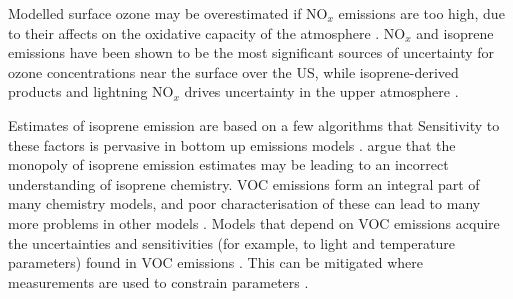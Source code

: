       Modelled surface ozone may be overestimated if NO$_x$ emissions are too high, due to their affects on the oxidative capacity of the atmosphere \parencite{Travis2016}.
      NO$_x$ and isoprene emissions have been shown to be the most significant sources of uncertainty for ozone concentrations near the surface over the US, while isoprene-derived products and lightning NO$_x$ drives uncertainty in the upper atmosphere \parencite{Christian2017}.
      
      
      Estimates of isoprene emission are based on a few algorithms that 
      Sensitivity to these factors is pervasive in bottom up emissions models \parencite[e.g.,][]{Marais2014, Miller2014, Messina2016}.
      \textcite{Arneth2008} argue that the monopoly of isoprene emission estimates may be leading to an incorrect understanding of isoprene chemistry.
      VOC emissions form an integral part of many chemistry models, and poor characterisation of these can lead to many more problems in other models \parencite[e.g.,][]{Yue2015}.
      Models that depend on VOC emissions acquire the uncertainties and sensitivities (for example, to light and temperature parameters) found in VOC emissions \parencite{Yue2015}.
      This can be mitigated where measurements are used to constrain parameters \parencite[e.g.,][]{Stavrakou2014}.
